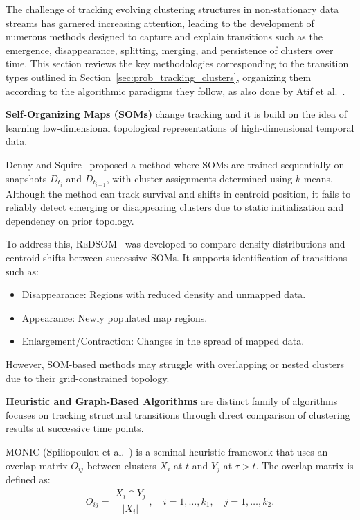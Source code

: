 The challenge of tracking evolving clustering structures in non-stationary data
streams has garnered increasing attention, leading to the development of
numerous methods designed to capture and explain transitions such as the
emergence, disappearance, splitting, merging, and persistence of clusters over
time. This section reviews the key methodologies corresponding to the
transition types outlined in Section~\ref{sec:prob_tracking_clusters},
organizing them according to the algorithmic paradigms they follow, as also
done by Atif et al.~\cite{tracking_review}.

\textbf{Self-Organizing Maps (SOMs)} change tracking and it is build on the idea of
learning low-dimensional topological representations of high-dimensional temporal data.

Denny and Squire~\cite{som_tracking} proposed a method where \textsc{SOMs} are
trained sequentially on snapshots $D_{t_i}$ and $D_{t_{i+1}}$, with cluster
assignments determined using $k$-means. Although the method can track survival
and shifts in centroid position, it fails to reliably detect emerging or
disappearing clusters due to static initialization and dependency on prior
topology.

To address this, \textsc{ReDSOM}~\cite{redsom_tracking} was developed to
compare density distributions and centroid shifts between successive SOMs. It
supports identification of transitions such as:

\begin{itemize}
    \item Disappearance: Regions with reduced density and unmapped data.

    \item Appearance: Newly populated map regions.

    \item Enlargement/Contraction: Changes in the spread of mapped data.
\end{itemize}

However, SOM-based methods may struggle with overlapping or nested clusters due
to their grid-constrained topology.

\textbf{Heuristic and Graph-Based Algorithms} are distinct family of algorithms focuses
on tracking structural transitions through direct comparison of clustering results at
successive time points.

\textsc{MONIC} (Spiliopoulou et al.~\cite{monic}) is a seminal heuristic framework that uses an overlap
matrix $O_{ij}$ between clusters $X_i$ at $t$ and $Y_j$ at $\tau > t$.
The overlap matrix is defined as:
\begin{equation}
    O_{ij} = \frac{|X_i \cap Y_j|}{|X_i|}, \quad i = 1, \ldots, k_1, \quad j = 1, \ldots, k_2.
\end{equation}


